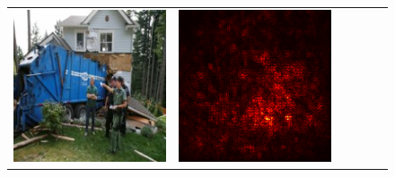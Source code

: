 \documentclass[preprint,12pt]{elsarticle}
\begin{document}
\begin{figure}[p]
\begin{tabular}{cccccc}
  \includegraphics[scale=\scale]{../visualizations/examples/imagenette/resnet18/images/1.png} &
  \includegraphics[scale=\scale]{../visualizations/examples/imagenette/resnet18/saliency_map/1.png} & 

\end{tabular}
\end{figure}
\end{document}
